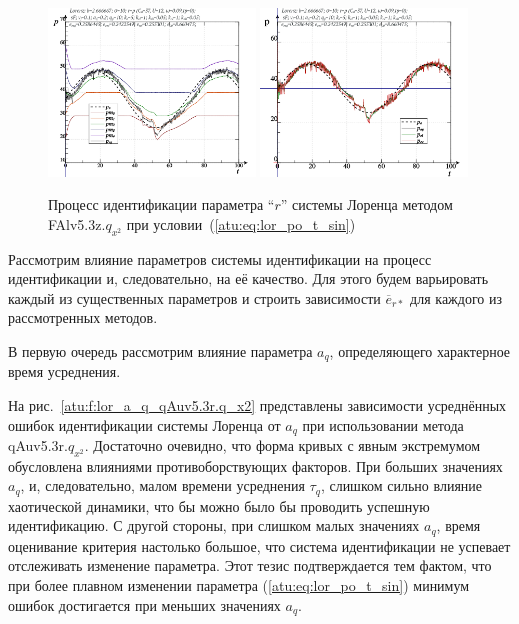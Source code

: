 \begin{figure}[h!]
  \centerline{
    \includegraphics[width=0.49\textwidth]{p/cha/lor/FAlv5.3z/lor_FAlv5_3z_qx2-pl_n_sin.png}
    \hfill
    \includegraphics[width=0.49\textwidth]{p/cha/lor/FAlv5.3z/lor_FAlv5_3z_qx2-p_p_sin.png}
  }
  \caption{Процесс идентификации параметра ``$r$'' системы Лоренца методом FAlv5.3z.$q_{x^2}$ при условии~(\ref{atu:eq:lor_po_t_sin})}
  \label{atu:f:lor_id_FAlv5.3z.q_x2_sin}
\end{figure}


Рассмотрим влияние параметров системы идентификации на
процесс идентификации и, следовательно, на её качество.
Для этого будем варьировать каждый из существенных
параметров и строить зависимости $\overline{e}_{r*}$
для каждого из рассмотренных методов.

В первую очередь рассмотрим влияние параметра
$a_q$, определяющего характерное время усреднения.

На рис.~\ref{atu:f:lor_a_q_qAuv5.3r.q_x2} представлены зависимости
усреднённых ошибок идентификации системы Лоренца от $a_q$ при использовании метода qAuv5.3r.$q_{x^2}$.
Достаточно очевидно, что форма кривых с явным экстремумом обусловлена
влияниями противоборствующих факторов. При больших значениях $a_q$,
и, следовательно, малом времени усреднения $\tau_q$,
слишком сильно влияние хаотической динамики, что бы можно было бы
проводить успешную идентификацию. С другой стороны,
при слишком малых значениях $a_q$, время оценивание критерия настолько большое,
что система идентификации не успевает отслеживать изменение параметра.
Этот тезис подтверждается тем фактом, что при более плавном изменении параметра
(\ref{atu:eq:lor_po_t_sin})
минимум ошибок достигается при меньших значениях $a_q$.

